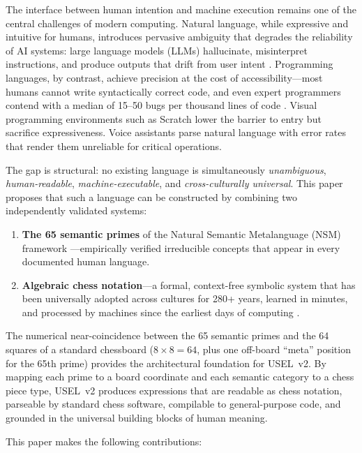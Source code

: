 \documentclass[11pt,a4paper]{article}
\begin{document}
The interface between human intention and machine execution remains one of the central challenges of modern computing. Natural language, while expressive and intuitive for humans, introduces pervasive ambiguity that degrades the reliability of AI systems: large language models (LLMs) hallucinate, misinterpret instructions, and produce outputs that drift from user intent \citep{ji2023survey}. Programming languages, by contrast, achieve precision at the cost of accessibility---most humans cannot write syntactically correct code, and even expert programmers contend with a median of 15--50 bugs per thousand lines of code \citep{mcconnell2004code}. Visual programming environments such as Scratch \citep{resnick2009scratch} lower the barrier to entry but sacrifice expressiveness. Voice assistants parse natural language with error rates that render them unreliable for critical operations.

The gap is structural: no existing language is simultaneously \emph{unambiguous}, \emph{human-readable}, \emph{machine-executable}, and \emph{cross-culturally universal}. This paper proposes that such a language can be constructed by combining two independently validated systems:

\begin{enumerate}[nosep]
    \item \textbf{The 65 semantic primes} of the Natural Semantic Metalanguage (NSM) framework \citep{wierzbicka1996semantics, goddard2014words}---empirically verified irreducible concepts that appear in every documented human language.
    \item \textbf{Algebraic chess notation}---a formal, context-free symbolic system that has been universally adopted across cultures for 280+ years, learned in minutes, and processed by machines since the earliest days of computing \citep{shannon1950programming}.
\end{enumerate}

The numerical near-coincidence between the 65 semantic primes and the 64 squares of a standard chessboard ($8 \times 8 = 64$, plus one off-board ``meta'' position for the 65th prime) provides the architectural foundation for USEL~v2. By mapping each prime to a board coordinate and each semantic category to a chess piece type, USEL~v2 produces expressions that are readable as chess notation, parseable by standard chess software, compilable to general-purpose code, and grounded in the universal building blocks of human meaning.

This paper makes the following contributions:
\end{document}
